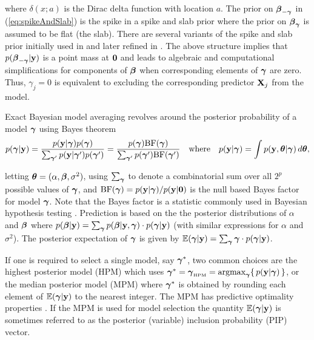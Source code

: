 \noindent where $\delta(x;a)$ is the Dirac delta function with location $a$.
The prior on ${\boldsymbol \beta}_{-{\boldsymbol \gamma}}$ in (\ref{eq:spikeAndSlab}) is the spike in a
spike and slab prior where the prior on ${\boldsymbol \beta}_{{\boldsymbol \gamma}}$ is assumed to be
flat (the slab). There are several variants of the spike and slab prior
initially used in \cite{Mitchell1988} and later refined in \cite{George1993}.
The above structure implies that $p({\boldsymbol \beta}_{-{\boldsymbol \gamma}}|{\bf y})$ is a point mass at
${\bf 0}$ and leads to algebraic and computational simplifications for
components of ${\boldsymbol \beta}$ when corresponding elements of ${\boldsymbol \gamma}$ are zero.
Thus, $\gamma_j=0$ is equivalent to excluding the corresponding predictor
${\bf X}_j$ from the model.


Exact Bayesian model averaging revolves around the posterior probability of a
model ${\boldsymbol \gamma}$ using Bayes theorem
\begin{equation*}
\displaystyle p({\boldsymbol \gamma}|{\bf y}) = \frac{p({\bf y}|{\boldsymbol \gamma})p({\boldsymbol \gamma})}{\sum_{{\boldsymbol \gamma}'} p({\bf y}|{\boldsymbol \gamma}')p({\boldsymbol \gamma}')} = \frac{p({\boldsymbol \gamma})\mbox{BF}({\boldsymbol \gamma})}{\sum_{{\boldsymbol \gamma}'} p({\boldsymbol \gamma}')\mbox{BF}({\boldsymbol \gamma}')}
\quad \mbox{where} \quad 
p({\bf y}|{\boldsymbol \gamma}) = \int p({\bf y},{\boldsymbol \theta}|{\boldsymbol \gamma}) \, d{\boldsymbol \theta},
\end{equation*}

\noindent letting ${\boldsymbol \theta} = (\alpha,{\boldsymbol \beta},\sigma^2)$, using $\sum_{{\boldsymbol \gamma}}$
to denote a combinatorial sum over all $2^p$ possible values of ${\boldsymbol \gamma}$, and
$\mbox{BF}({\boldsymbol \gamma}) = p({\bf y}|{\boldsymbol \gamma})/p({\bf y}|{\bf 0})$ is the null based Bayes
factor for model ${\boldsymbol \gamma}$.  Note that the Bayes factor is a statistic commonly
used in Bayesian hypothesis testing \citep{Kass1995,OrmerodEtal2017}.
Prediction is based on the the posterior distributions of $\alpha$ and ${\boldsymbol \beta}$
where $p({\boldsymbol \beta}|{\bf y}) = \sum_{{\boldsymbol \gamma}} p({\boldsymbol \beta}|{\bf y},{\boldsymbol \gamma}) \cdot
p({\boldsymbol \gamma}|{\bf y})$ (with similar expressions for $\alpha$ and $\sigma^2$).  The
posterior expectation of ${\boldsymbol \gamma}$ is given by ${\mathbb E}({\boldsymbol \gamma}|{\bf y}) =
\sum_{{\boldsymbol \gamma}} {\boldsymbol \gamma} \cdot p({\boldsymbol \gamma}|{\bf y})$.

If one is required to select a single model, say ${\boldsymbol \gamma}^*$, two common
choices are the highest posterior model (HPM) which uses $\vgamma^* =
\vgamma_{\mbox{\tiny HPM}} = \argmax_\vgamma \{ \, p(\vy|\vgamma) \, \}$, or
the median posterior model (MPM) where ${\boldsymbol \gamma}^*$ is obtained by rounding each
element of ${\mathbb E}({\boldsymbol \gamma}|{\bf y})$ to the nearest integer.  The MPM has predictive
optimality properties \citep{Barbieri2004}.  If the MPM is used for model
selection the quantity ${\mathbb E}({\boldsymbol \gamma}|{\bf y})$ is sometimes referred to as the
posterior (variable) inclusion probability (PIP) vector.

